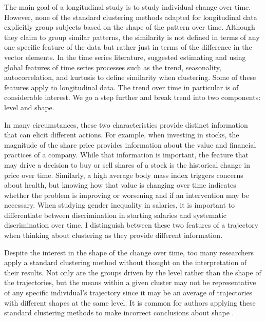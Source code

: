 The main goal of a longitudinal study is to study individual change over time. However, none of the standard clustering methods adapted for longitudinal data explicitly group subjects based on the shape of the pattern over time. Although they claim to group similar patterns, the similarity is not defined in terms of any one specific feature of the data but rather just in terms of the difference in the vector elements. In the time series literature, \textcite{wang2006} suggested estimating and using global features of time series processes such as the trend, seasonality, autocorrelation, and kurtosis to define similarity when clustering. Some of these features apply to longitudinal data. The trend over time in particular is of considerable interest. We go a step further and break trend into two components: level and shape. 

In many circumstances, these two characteristics provide distinct information that can elicit different actions. For example, when investing in stocks, the magnitude of the share price provides information about the value and financial practices of a company. While that information is important, the feature that may drive a decision to buy or sell shares of a stock is the historical change in price over time. Similarly, a high average body mass index triggers concerns about health, but knowing how that value is changing over time indicates whether the problem is improving or worsening and if an intervention may be necessary. When studying gender inequality in salaries, it is important to differentiate between discrimination in starting salaries  and systematic discrimination over time. I distinguish between these two features of a trajectory when thinking about clustering as they provide different information.  

Despite the interest in the shape of the change over time, too many researchers apply a standard clustering method without  thought on the interpretation of their results. Not only are the groups driven by the level rather than the shape of the trajectories, but the means within a given cluster may not be representative of any specific individual's trajectory since it may be an average of trajectories with different shapes at the same level. It is common for authors applying these standard clustering methods to make incorrect conclusions about shape \cite{windle2004,mulvaney2006,broadbent2008,pryor2011,mccoy2010}. 

